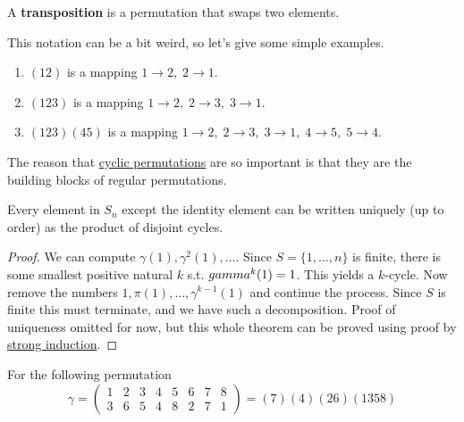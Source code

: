 	\begin{definition}[Transposition]
		\label{def:transposition}
	  A \textbf{transposition} is a permutation that swaps two elements. 
	\end{definition}

  \begin{example}
    \label{ex:some-cyclic-permutations}
    This notation can be a bit weird, so let's give some simple examples. 
    \begin{enumerate}
      \item $(1 2)$ is a mapping $1 \rightarrow 2,\; 2 \rightarrow 1$. 
      \item $(1 2 3)$ is a mapping $1\rightarrow 2,\; 2 \rightarrow 3,\; 3 \rightarrow 1$. 
      \item $(1 2 3) (4 5)$ is a mapping $1\rightarrow 2,\; 2 \rightarrow 3,\; 3 \rightarrow 1, \;4 \rightarrow 5, \;5 \rightarrow 4$. 
    \end{enumerate}
  \end{example}

  The reason that \hyperref[def:cyclic-permutation]{cyclic permutations} are so important is that they are the building blocks of regular permutations. 

  \begin{theorem}
    \label{thm:cycle-decomposition-of-permutations}
    Every element in $S_n$ except the identity element can be written uniquely (up to order) as the product of disjoint cycles. 
  \end{theorem}
  \begin{proof}
    We can compute $\gamma(1), \gamma^2 (1), \ldots$. Since $S = \{1, \ldots, n\}$ is finite, there is some smallest positive natural $k$ s.t. $\\gamma^k (1) = 1$. This yields a $k$-cycle. Now remove the numbers $1, \pi(1), \ldots, \gamma^{k-1} (1)$ and continue the process. Since $S$ is finite this must terminate, and we have such a decomposition. Proof of uniqueness omitted for now, but this whole theorem can be proved using proof by \hyperref[st-thm:strong-induction-principle]{strong induction}.  
  \end{proof}

  \begin{example}
    \label{ex:cyclic-decompositions}
    For the following permutation
    \begin{equation}
      \gamma = \begin{pmatrix} 
        1 & 2 & 3 & 4 & 5 & 6 & 7 & 8 \\ 
        3 & 6 & 5 & 4 & 8 & 2 & 7 & 1 
      \end{pmatrix} = (7)(4)(26)(1358)
    \end{equation} 
  \end{example}

